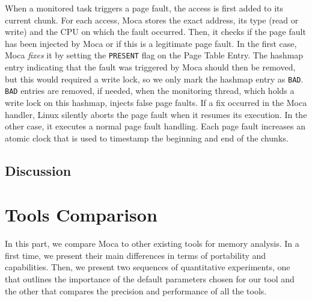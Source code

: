 When a monitored task triggers a page fault, the access is first added
to its current chunk. For each access, \gls{Moca} stores the exact address, its type (read
or write) and the CPU on which the fault occurred.  Then, it checks if the page
fault has been injected by \gls{Moca} or if this is a legitimate page fault.
In the first
case, \gls{Moca} \emph{fixes} it by setting the \texttt{PRESENT} flag on the
Page Table Entry.
The hashmap entry indicating that the fault was triggered by \gls{Moca} should then
be removed, but this would required a write lock, so we only mark the hashmap
entry as \texttt{BAD}. \texttt{BAD} entries are removed, if needed, when the
monitoring thread, which holds a write lock on this hashmap, injects false page faults.
If a fix occurred in the \gls{Moca} handler, Linux silently aborts the page fault
when it resumes its execution. In the other case, it executes a normal page fault handling. Each page
fault increases an atomic clock that is used to timestamp the beginning and end
of the chunks.


\subsection{Discussion}

\section{Tools Comparison}
\label{sec:Tools-Comp}

In this part, we compare \gls{Moca} to other existing tools for memory analysis. In a first time, we present their main differences in terms of portability
and capabilities. Then, we present two sequences of quantitative experiments, one that outlines the importance of the default parameters chosen for our tool
and the other that compares the precision and performance of all the tools.

